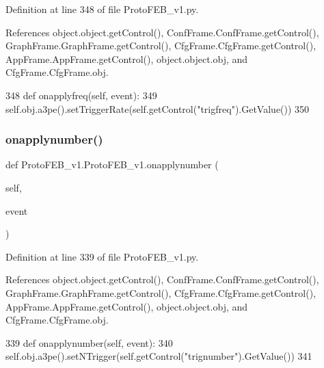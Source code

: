 Definition at line 348 of file Proto\+F\+E\+B\+\_\+v1.\+py.



References object.\+object.\+get\+Control(), Conf\+Frame.\+Conf\+Frame.\+get\+Control(), Graph\+Frame.\+Graph\+Frame.\+get\+Control(), Cfg\+Frame.\+Cfg\+Frame.\+get\+Control(), App\+Frame.\+App\+Frame.\+get\+Control(), object.\+object.\+obj, and Cfg\+Frame.\+Cfg\+Frame.\+obj.


\begin{DoxyCode}
348     \textcolor{keyword}{def }onapplyfreq(self, event):
349         self.obj.a3pe().setTriggerRate(self.getControl(\textcolor{stringliteral}{"trigfreq"}).GetValue())
350 
\end{DoxyCode}
\mbox{\label{classProtoFEB__v1_1_1ProtoFEB__v1_aadcdf53a503962a44439327ee7819de7}} 
\subsubsection{\texorpdfstring{onapplynumber()}{onapplynumber()}}
{\footnotesize\ttfamily def Proto\+F\+E\+B\+\_\+v1.\+Proto\+F\+E\+B\+\_\+v1.\+onapplynumber (\begin{DoxyParamCaption}\item[{}]{self,  }\item[{}]{event }\end{DoxyParamCaption})}



Definition at line 339 of file Proto\+F\+E\+B\+\_\+v1.\+py.



References object.\+object.\+get\+Control(), Conf\+Frame.\+Conf\+Frame.\+get\+Control(), Graph\+Frame.\+Graph\+Frame.\+get\+Control(), Cfg\+Frame.\+Cfg\+Frame.\+get\+Control(), App\+Frame.\+App\+Frame.\+get\+Control(), object.\+object.\+obj, and Cfg\+Frame.\+Cfg\+Frame.\+obj.


\begin{DoxyCode}
339     \textcolor{keyword}{def }onapplynumber(self, event):
340         self.obj.a3pe().setNTrigger(self.getControl(\textcolor{stringliteral}{"trignumber"}).GetValue())
341 
\end{DoxyCode}
\mbox{\label{classProtoFEB__v1_1_1ProtoFEB__v1_a5108ef129a2d3cf2415489db2b8ca0ed}} 
